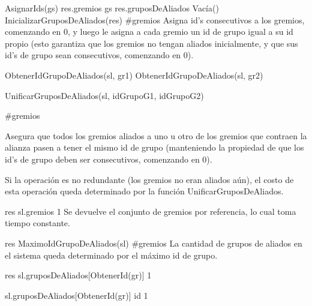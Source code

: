 {
	\state AsignarIds(gs)								
	\state res.gremios \asig gs 						
	\state
	\state res.gruposDeAliados \asig Vacía()			
	\state InicializarGruposDeAliados(res)				
}
{\#gremios}
{Asigna id's consecutivos a los gremios, comenzando en 0, y luego le asigna a cada gremio un id de grupo igual a su id propio (esto garantiza que los gremios no tengan aliados inicialmente, y que sus id's de grupo sean consecutivos, comenzando en 0). }

{
	\state {} \asig ObtenerIdGrupoDeAliados(sl, gr1)			
	\state {} \asig ObtenerIdGrupoDeAliados(sl, gr2)			
	\state 

													
		\state UnificarGruposDeAliados(sl, idGrupoG1, idGrupoG2)					
	\endif
}
{\#gremios}
{ Asegura que todos los gremios aliados a uno u otro de los gremios que contraen la alianza pasen a tener el mismo id de grupo (manteniendo la propiedad de que los id's de grupo deben ser consecutivos, comenzando en 0).

\hspace{10pt} Si la operación es no redundante (los gremios no eran aliados aún), el costo de esta operación queda determinado por la función UnificarGruposDeAliados. }

{
	\state res \asig sl.gremios								
}
{1}
{ Se devuelve el conjunto de gremios por referencia, lo cual toma tiempo constante. }

{
	\state res \asig MaximoIdGrupoDeAliados(sl)			
}
{\#gremios}
{La cantidad de grupos de aliados en el sistema queda determinado por el máximo id de grupo.}

{
	\state res \asig sl.gruposDeAliados[ObtenerId(gr)]			
}
{1}
{}

{
	\state sl.gruposDeAliados[ObtenerId(gr)] \asig id			
}
{1}
{}

